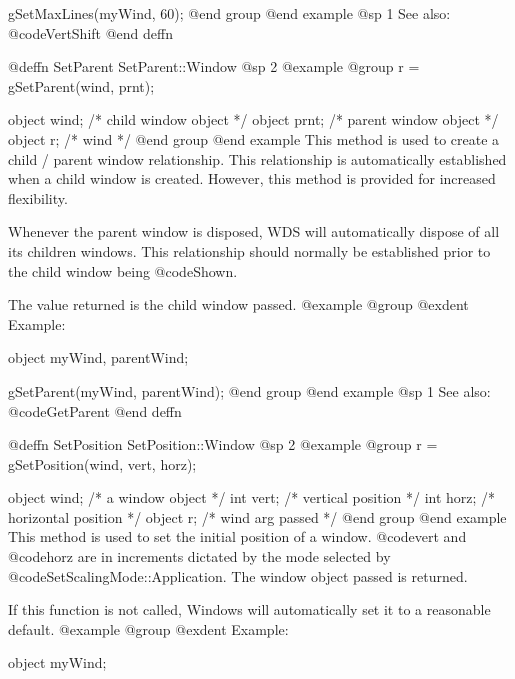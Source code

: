 gSetMaxLines(myWind, 60);
@end group
@end example
@sp 1
See also:  @code{VertShift}
@end deffn













@deffn {SetParent} SetParent::Window
@sp 2
@example
@group
r = gSetParent(wind, prnt);

object  wind;   /*  child window object   */
object  prnt;   /*  parent window object  */
object  r;      /*  wind                  */
@end group
@end example
This method is used to create a child / parent window relationship.
This relationship is automatically established when a child window is
created.  However, this method is provided for increased flexibility.

Whenever the parent window is disposed, WDS will automatically dispose
of all its children windows.  This relationship should normally be
established prior to the child window being @code{Shown}.

The value returned is the child window passed.
@example
@group
@exdent Example:

object  myWind, parentWind;

gSetParent(myWind, parentWind);
@end group
@end example
@sp 1
See also:  @code{GetParent}
@end deffn
















@deffn {SetPosition} SetPosition::Window
@sp 2
@example
@group
r = gSetPosition(wind, vert, horz);

object  wind;   /*  a window object     */
int     vert;   /*  vertical position   */
int     horz;   /*  horizontal position */
object  r;      /*  wind arg passed     */
@end group
@end example
This method is used to set the initial position of a window.
@code{vert} and @code{horz} are in increments dictated by the
mode selected by @code{SetScalingMode::Application}.  The window
object passed is returned.

If this function is not called, Windows will automatically set it to a
reasonable default.
@example
@group
@exdent Example:

object  myWind;


